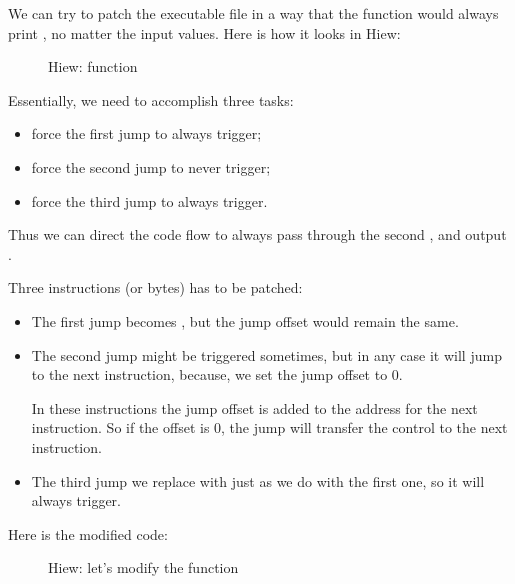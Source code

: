 



\clearpage
{}

We can try to patch the executable file in a way 
that the  function would always print , 
no matter the input values.
Here is how it looks in Hiew:

\begin{figure}[H]
\centering
{}
\caption{Hiew:  function}
\label{fig:jcc_hiew_1}
\end{figure}

Essentially, we need to accomplish three tasks:
\begin{itemize}
\item force the first jump to always trigger;
\item force the second jump to never trigger;
\item force the third jump to always trigger.
\end{itemize}

Thus we can direct the code flow to always pass through the second \printf, and output .

Three instructions (or bytes) has to be patched:

\begin{itemize}
\item The first jump becomes \JMP, but the \gls{jump offset} would remain the same.

\item 
The second jump might be triggered sometimes, but in any case it will jump to the next
instruction, because, we set the \gls{jump offset} to 0.

In these instructions the \gls{jump offset} is added to the address for the next instruction.
So if the offset is 0,
the jump will transfer the control to the next instruction.

\item 
The third jump we replace with \JMP just as we do with the first one, so it will always trigger.

\end{itemize}

\clearpage
Here is the modified code:

\begin{figure}[H]
\centering
{}
\caption{Hiew: let's modify the  function}
\label{fig:jcc_hiew_2}
\end{figure}

